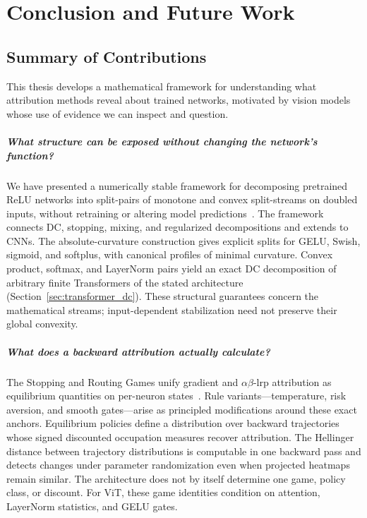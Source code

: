 \chapter{Conclusion and Future Work}\label{ch:conclusion}

\section{Summary of Contributions}\label{sec:summary_contributions}

This thesis develops a mathematical framework for understanding what attribution methods reveal about trained networks, motivated by vision models whose use of evidence we can inspect and question.

\paragraph{What structure can be exposed without changing the network's function?}
We have presented a numerically stable framework for decomposing pretrained ReLU networks into split-pairs of monotone and convex split-streams on doubled inputs, without retraining or altering model predictions~\parencite{hiddenMono}. The framework connects DC, stopping, mixing, and regularized decompositions and extends to CNNs. The absolute-curvature construction gives explicit splits for GELU, Swish, sigmoid, and softplus, with canonical profiles of minimal curvature. Convex product, softmax, and LayerNorm pairs yield an exact DC decomposition of arbitrary finite Transformers of the stated architecture (Section~\ref{sec:transformer_dc}). These structural guarantees concern the mathematical streams; input-dependent stabilization need not preserve their global convexity.

\paragraph{What does a backward attribution actually calculate?}
The Stopping and Routing Games unify gradient and $\alpha\beta$-\ac{lrp} attribution as equilibrium quantities on per-neuron states~\parencite{playingBackward2026}. Rule variants---temperature, risk aversion, and smooth gates---arise as principled modifications around these exact anchors. Equilibrium policies define a distribution over backward trajectories whose signed discounted occupation measures recover attribution. The Hellinger distance between trajectory distributions is computable in one backward pass and detects changes under parameter randomization even when projected heatmaps remain similar. The architecture does not by itself determine one game, policy class, or discount. For ViT, these game identities condition on attention, LayerNorm statistics, and GELU gates.

